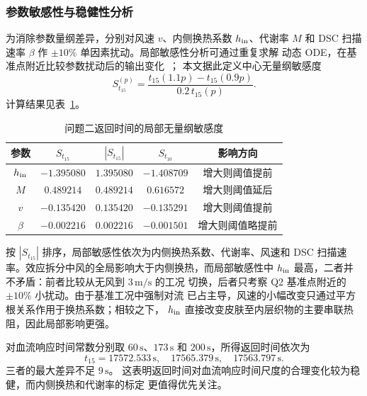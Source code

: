 \documentclass[withoutpreface,bwprint]{cumcmthesis}
\begin{document}
\subsubsection{参数敏感性与稳健性分析}
为消除参数量纲差异，分别对风速 $v$、内侧换热系数 $h_{\rm in}$、代谢率 $M$
和 DSC 扫描速率 $\beta$ 作 $\pm10\%$ 单因素扰动。局部敏感性分析可通过重复求解
动态 ODE，在基准点附近比较参数扰动后的输出变化~\cite{lakrisenko2024sensitivity}；
本文据此定义中心无量纲敏感度
\begin{equation}
S_{t_{15}}^{(p)}=
\frac{t_{15}(1.1p)-t_{15}(0.9p)}{0.2\,t_{15}(p)}.
\end{equation}
计算结果见表~\ref{tab:q2-sensitivity}。
\begin{table}[H]
    \centering
    \small
    \caption{问题二返回时间的局部无量纲敏感度}
    \label{tab:q2-sensitivity}
    \begin{tabular}{ccccc}
        \toprule[1.5pt]
        参数 & $S_{t_{15}}$ & $|S_{t_{15}}|$ & $S_{t_{10}}$ & 影响方向\\
        \midrule[1pt]
        $h_{\rm in}$ & $-1.395080$ & $1.395080$ & $-1.408709$ & 增大则阈值提前\\
        $M$           & $ 0.489214$ & $0.489214$ & $ 0.616572$ & 增大则阈值延后\\
        $v$           & $-0.135420$ & $0.135420$ & $-0.135291$ & 增大则阈值提前\\
        $\beta$       & $-0.002216$ & $0.002216$ & $-0.001501$ & 增大则阈值略提前\\
        \bottomrule[1.5pt]
    \end{tabular}
\end{table}

按 $|S_{t_{15}}|$ 排序，局部敏感性依次为内侧换热系数、代谢率、风速和 DSC
扫描速率。效应拆分中风的全局影响大于内侧换热，而局部敏感性中
$h_{\rm in}$ 最高，二者并不矛盾：前者比较从无风到 $3\,\mathrm{m/s}$ 的工况
切换，后者只考察 Q2 基准点附近的 $\pm10\%$ 小扰动。由于基准工况中强制对流
已占主导，风速的小幅改变只通过平方根关系作用于换热系数；相较之下，
$h_{\rm in}$ 直接改变皮肤至内层织物的主要串联热阻，因此局部影响更强。

对血流响应时间常数分别取 $60\,\mathrm s$、$173\,\mathrm s$ 和
$200\,\mathrm s$，所得返回时间依次为
\begin{equation}
t_{15}=17572.533\,\mathrm s,\quad17565.379\,\mathrm s,\quad17563.797\,\mathrm s.
\end{equation}
三者的最大差异不足 $9\,\mathrm s$。
这表明返回时间对血流响应时间尺度的合理变化较为稳健，而内侧换热和代谢率的标定
更值得优先关注。
\end{document}
